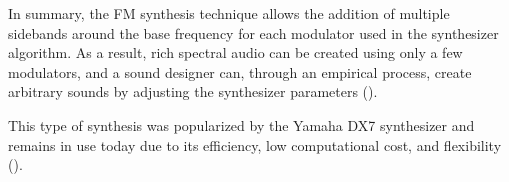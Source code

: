 \documentclass[sigconf,natbib=false]{acmart}
\begin{document}
In summary, the FM synthesis technique allows the addition of multiple sidebands around the base frequency for each modulator used in the synthesizer algorithm. As a result, rich spectral audio can be created using only a few modulators, and a sound designer can, through an empirical process, create arbitrary sounds by adjusting the synthesizer parameters (\textcite{lazzarini2023higherorder}).

This type of synthesis was popularized by the Yamaha DX7 synthesizer and remains in use today due to its efficiency, low computational cost, and flexibility (\textcite{steinmetz2022ddx7}).







\end{document}
